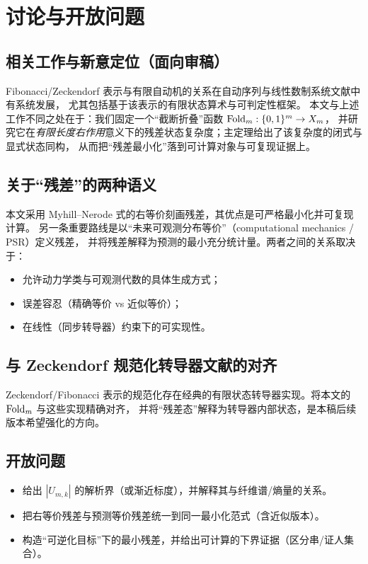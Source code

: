 \section{讨论与开放问题}

\subsection{相关工作与新意定位（面向审稿）}
Fibonacci/Zeckendorf 表示与有限自动机的关系在自动序列与线性数制系统文献中有系统发展，
尤其包括基于该表示的有限状态算术与可判定性框架。\cite{Frougny1991FibonacciAutomata,AlloucheShallit2003AutomaticSequences,AhlbachEtAl2013ZeckendorfArithmetic}
本文与上述工作不同之处在于：我们固定一个“截断折叠”函数 $\mathrm{Fold}_m:\{0,1\}^m\to X_m$，
并研究它在\emph{有限长度右作用}意义下的残差状态复杂度；主定理给出了该复杂度的闭式与显式状态同构，
从而把“残差最小化”落到可计算对象与可复现证据上。

\subsection{关于“残差”的两种语义}
本文采用 Myhill--Nerode 式的右等价刻画残差，其优点是可严格最小化并可复现计算。
另一条重要路线是以“未来可观测分布等价”（computational mechanics / PSR）定义残差，
并将残差解释为预测的最小充分统计量。两者之间的关系取决于：
\begin{itemize}
  \item 允许动力学类与可观测代数的具体生成方式；
  \item 误差容忍（精确等价 vs 近似等价）；
  \item 在线性（同步转导器）约束下的可实现性。
\end{itemize}

\subsection{与 Zeckendorf 规范化转导器文献的对齐}
Zeckendorf/Fibonacci 表示的规范化存在经典的有限状态转导器实现。将本文的 $\mathrm{Fold}_m$ 与这些实现精确对齐，
并将“残差态”解释为转导器内部状态，是本稿后续版本希望强化的方向。

\subsection{开放问题}
\begin{itemize}
  \item 给出 $|U_{m,k}|$ 的解析界（或渐近标度），并解释其与纤维谱/熵量的关系。
  \item 把右等价残差与预测等价残差统一到同一最小化范式（含近似版本）。
  \item 构造“可逆化目标”下的最小残差，并给出可计算的下界证据（区分串/证人集合）。
\end{itemize}

